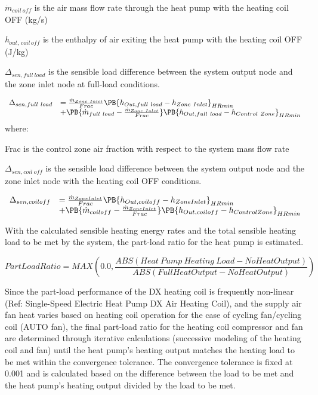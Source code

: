 \({\dot{m}_{coil~off}}\) is the air mass flow rate through the heat pump with the heating coil OFF (kg/s)

\emph{h\(_{out,\, coil \, off}\)} is the enthalpy of air exiting the heat pump with the heating coil OFF (J/kg)

\(\Delta_{sen,full~load}\) is the sensible load difference between the system output node and the zone inlet node at full-load conditions.

\begin{equation}
  \begin{array}{rl}
    \Delta_{sen,full~load} &= \frac{\dot{m}_{Zone~Inlet}}{Frac} \PB{h_{Out,full~load} - h_{Zone~Inlet}}_{HRmin} \\
                           &+ \PB{\dot{m}_{full~load} - \frac{\dot{m}_{Zone~Inlet}}{Frac}} \PB{h_{Out,full~load} - h_{Control~Zone}}_{HRmin}
  \end{array}
\end{equation}
where:

Frac is the control zone air fraction with respect to the system mass flow rate

\(\Delta_{sen,coil~off}\) is the sensible load difference between the system output node and the zone inlet node with the heating coil OFF conditions.

\begin{equation}
  \begin{array}{rl}
    \Delta_{sen,coil off} &= \frac{\dot{m}_{ZoneInlet}}{Frac} \PB{h_{Out,coil off} - h_{ZoneInlet}}_{HRmin} \\
                           &+ \PB{\dot{m}_{coil off} - \frac{\dot{m}_{ZoneInlet}}{Frac}} \PB{h_{Out,coil off} - h_{ControlZone}}_{HRmin}
  \end{array}
\end{equation}

With the calculated sensible heating energy rates and the total sensible heating load to be met by the system, the part-load ratio for the heat pump is estimated.

\begin{equation}
PartLoadRatio = MAX\left( {0.0,\frac{{ABS\left( {Heat~Pump~Heating~Load - NoHeatOutput} \right)}}{{ABS\left( {FullHeatOutput - NoHeatOutput} \right)}}} \right)
\label{eq:UnitarySystemPartLoadRatioHeating590}
\end{equation}

Since the part-load performance of the DX heating coil is frequently non-linear (Ref: Single-Speed Electric Heat Pump DX Air Heating Coil), and the supply air fan heat varies based on heating coil operation for the case of cycling fan/cycling coil (AUTO fan), the final part-load ratio for the heating coil compressor and fan are determined through iterative calculations (successive modeling of the heating coil and fan) until the heat pump's heating output matches the heating load to be met within the convergence tolerance. The convergence tolerance is fixed at 0.001 and is calculated based on the difference between the load to be met and the heat pump's heating output divided by the load to be met.

